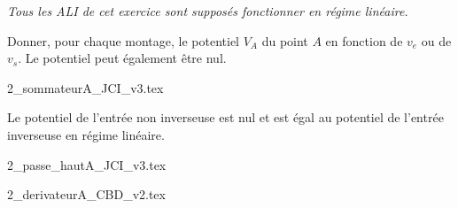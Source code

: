 \hauteurLargeurCadreReponse		{6mm}{3cm}
\initialisationEntrainement

\debutEntrainement

{\itshape Tous les ALI de cet exercice sont supposés fonctionner en régime linéaire. }

Donner, pour chaque montage, le potentiel \(V_{A}\) du point \(A\) en fonction de \(v_{e}\) ou de \(v_{s}\). Le potentiel peut également être nul.



\begin{enonce}
  \shorthandoff{!:}
  {2_sommateurA_JCI_v3.tex}
  \shorthandon{!:}
\end{enonce}


\begin{corrige}
  Le potentiel de l’entrée non inverseuse est nul et est égal au potentiel de l’entrée inverseuse en régime linéaire.
\end{corrige}




\begin{enonce}
  \shorthandoff{!:}
  {2_passe_hautA_JCI_v3.tex}
  \shorthandon{!:}
\end{enonce}





\begin{enonce}
  \shorthandoff{!:}
  {2_derivateurA_CBD_v2.tex}
  \shorthandon{!:}  
\end{enonce}

